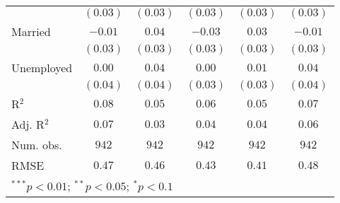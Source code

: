 \begin{table}
\begin{center}
\begin{tabular}{l c c c c c}
              & $(0.03)$      & $(0.03)$      & $(0.03)$      & $(0.03)$      & $(0.03)$      \\
Married       & $-0.01$       & $0.04$        & $-0.03$       & $0.03$        & $-0.01$       \\
              & $(0.03)$      & $(0.03)$      & $(0.03)$      & $(0.03)$      & $(0.03)$      \\
Unemployed    & $0.00$        & $0.04$        & $0.00$        & $0.01$        & $0.04$        \\
              & $(0.04)$      & $(0.04)$      & $(0.03)$      & $(0.03)$      & $(0.04)$      \\
\midrule
R$^2$         & $0.08$        & $0.05$        & $0.06$        & $0.05$        & $0.07$        \\
Adj. R$^2$    & $0.07$        & $0.03$        & $0.04$        & $0.04$        & $0.06$        \\
Num. obs.     & $942$         & $942$         & $942$         & $942$         & $942$         \\
RMSE          & $0.47$        & $0.46$        & $0.43$        & $0.41$        & $0.48$        \\
\bottomrule
\multicolumn{6}{l}{\scriptsize{$^{***}p<0.01$; $^{**}p<0.05$; $^{*}p<0.1$}}
\end{tabular}
\label{tab_emo_week}
\end{center}
\end{table}

